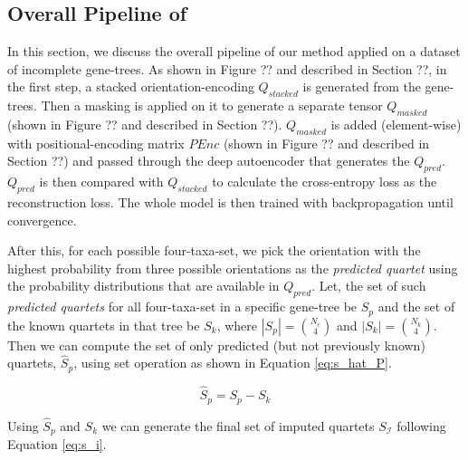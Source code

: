 \subsection{Overall Pipeline of \methodname}
In this section, we discuss the overall pipeline of our method \methodname applied on a dataset of incomplete gene-trees.
As shown in Figure ?? and described in Section ??, in the first step, a stacked orientation-encoding $Q_{stacked}$ is generated from the gene-trees. Then a masking is applied on it to generate a separate tensor $Q_{masked}$ (shown in Figure ?? and described in Section ??). $Q_{masked}$ is added (element-wise) with positional-encoding matrix $PEnc$ (shown in Figure ?? and described in Section ??) and passed through the deep autoencoder that generates the  $Q_{pred}$. $Q_{pred}$ is then compared with $Q_{stacked}$ to calculate the cross-entropy loss\SR{[cite]} as the reconstruction loss\SR{[cite]}. The whole model is then trained with backpropagation\SR{[cite]} 
until convergence.


After this, for each possible four-taxa-set, we pick the orientation with the highest probability from three possible orientations as the \textit{predicted quartet} using the probability distributions that are available in $Q_{pred}$. Let, the set of such \textit{predicted quartets} for all four-taxa-set in a specific gene-tree be $S_{p}$  and the set of the known quartets in that tree be $S_{k}$, where $|S_{p}|=\binom{N_c}{4}$ and $|S_{k}|=\binom{N_k}{4}$. Then we can compute the set of only predicted (but not previously known) quartets, $\hat{S}_{p}$, using set operation as shown in Equation \ref{eq:s_hat_P}.

\begin{equation}
\label{eq:s_hat_P}
\hat{S}_{p} = S_p - S_k
\end{equation}

Using $\hat{S}_{p}$ and $S_k$ we can generate the final set of imputed quartets $S_\mathcal{I}$ following Equation \ref{eq:s_i}. %

